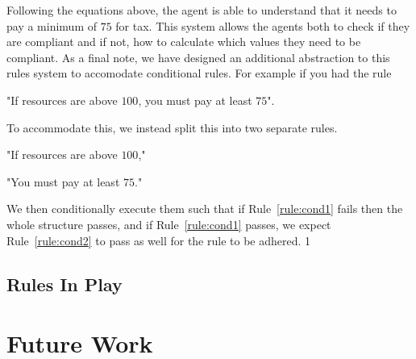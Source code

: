 Following the equations above, the agent is able to understand that it needs to pay a minimum of $75$ for tax. This system allows the agents both to check if they are compliant and if not, how to calculate which values they need to be compliant.
As a final note, we have designed an additional abstraction to this rules system to accomodate conditional rules.
For example if you had the rule 
\begin{rule_IIGO}
    "If resources are above $100$, you must pay at least $75$".
\end{rule_IIGO} 
To accommodate this, we instead split this into two separate rules.
\begin{rule_IIGO}
    "If resources are above $100$,"
    \label{rule:cond1}
\end{rule_IIGO}
\begin{rule_IIGO}
    "You must pay at least $75$."
    \label{rule:cond2}
\end{rule_IIGO}
We then conditionally execute them such that if Rule~\ref{rule:cond1} fails then the whole structure passes, and if Rule~\ref{rule:cond1} passes, we expect Rule~\ref{rule:cond2} to pass as well for the rule to be adhered.
1
\subsection{Rules In Play}

\section{Future Work}

